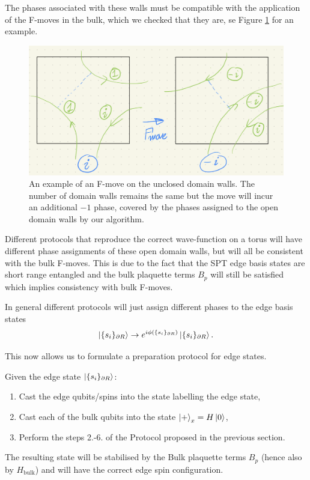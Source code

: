 \documentclass[a4paper,twocolumn,11pt]{quantumarticle}
\begin{document}
The phases associated with these walls must be compatible with the application of the F-moves in the bulk, which we checked that they are, se Figure \ref{fig:bulk_edge_move} for an example.\begin{figure}
\centering
\includegraphics[width=\linewidth]{Figures/bulk_F_move.png}
\caption{An example of an F-move on the unclosed domain walls. The number of domain walls remains the same but the move will incur an additional $-1$ phase, covered by the phases assigned to the open domain walls by our algorithm.}
\label{fig:bulk_edge_move}
\end{figure}
Different protocols that reproduce the correct wave-function on a torus will have different phase assignments of these open domain walls, but will all be consistent with the bulk F-moves. This is due to the fact that the SPT edge basis states are short range entangled and the bulk plaquette terms $B_p$ will still be satisfied which implies consistency with bulk F-moves.

In general different protocols will just assign different phases to the edge basis states\begin{equation}
\ket{\{s_i\}_{\partial R}} \rightarrow e^{i\phi(\{s_i\}_{\partial R})}\ket{\{s_i\}_{\partial R}}.  
\end{equation}

This now allows us to formulate a preparation protocol for edge states.

Given the edge state $\ket{\{s_i\}_{\partial R}}$:\begin{enumerate}
\item Cast the edge qubits/spins into the state labelling the edge state,
\item Cast each of the bulk qubits into the state $\ket{+}_x = H\ket{0}$,
\item Perform the steps 2.-6. of the Protocol proposed in the previous section.
\end{enumerate}
The resulting state will be stabilised by the Bulk plaquette terms $B_p$ (hence also by $H_{\text{bulk}}$) and will have the correct edge spin configuration.
\end{document}

